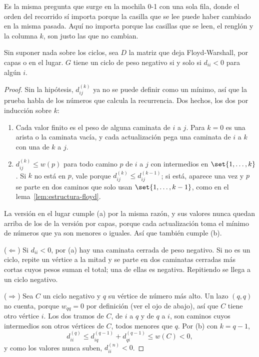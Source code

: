 \documentclass[11pt,letterpaper]{article}
\begin{document}
Es la misma pregunta que surge en la mochila 0-1 con una sola fila,
donde el orden del recorrido sí importa porque la casilla que se lee
puede haber cambiado en la misma pasada. Aquí no importa porque las
casillas que se leen, el renglón y la columna $k$, son justo las que
no cambian.

\begin{teorema}
  \label{teo:floyd-diagonal}
  Sin suponer nada sobre los ciclos, sea $D$ la matriz que deja
  Floyd-Warshall, por capas o en el lugar. $G$ tiene un ciclo de peso
  negativo si y solo si $d_{ii} < 0$ para algún $i$.
\end{teorema}

\begin{proof}
  Sin la hipótesis, $d^{(k)}_{ij}$ ya no se puede definir como un
  mínimo, así que la prueba habla de los números que calcula la
  recurrencia. Dos hechos, los dos por inducción sobre $k$:
  \begin{enumerate}[label=(\alph*), itemsep=0.1em]
    \item Cada valor finito es el peso de alguna caminata de $i$ a $j$.
          Para $k = 0$ es una arista o la caminata vacía, y cada
          actualización pega una caminata de $i$ a $k$ con una de $k$
          a $j$.
    \item $d^{(k)}_{ij} \le w(p)$ para todo camino $p$ de $i$ a $j$
          con intermedios en $\set{1, \dots, k}$. Si $k$ no está en
          $p$, vale porque $d^{(k)}_{ij} \le d^{(k-1)}_{ij}$; si está,
          aparece una vez y $p$ se parte en dos caminos que solo usan
          $\set{1, \dots, k - 1}$, como en el
          lema~\ref{lem:estructura-floyd}.
  \end{enumerate}
  La versión en el lugar cumple (a) por la misma razón, y sus valores
  nunca quedan arriba de los de la versión por capas, porque cada
  actualización toma el mínimo de números que ya son menores o
  iguales. Así que también cumple (b).

  ($\Leftarrow$) Si $d_{ii} < 0$, por (a) hay una caminata cerrada de
  peso negativo. Si no es un ciclo, repite un vértice a la mitad y se
  parte en dos caminatas cerradas más cortas cuyos pesos suman el
  total; una de ellas es negativa. Repitiendo se llega a un ciclo
  negativo.

  ($\Rightarrow$) Sea $C$ un ciclo negativo y $q$ su vértice de número
  más alto. Un lazo $(q, q)$ no cuenta, porque $w_{qq} = 0$ por
  definición (ver el ojo de abajo), así que $C$ tiene otro vértice
  $i$. Los dos tramos de $C$, de $i$ a $q$ y de $q$ a $i$, son caminos
  cuyos intermedios son otros vértices de $C$, todos menores que $q$.
  Por (b) con $k = q - 1$,
  \[
    d^{(q)}_{ii} \le d^{(q-1)}_{iq} + d^{(q-1)}_{qi} \le w(C) < 0 ,
  \]
  y como los valores nunca suben, $d^{(n)}_{ii} < 0$.
\end{proof}
\end{document}
